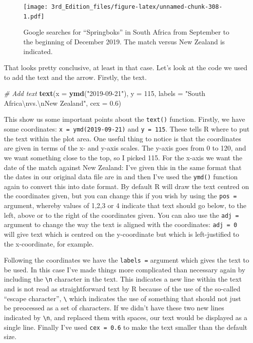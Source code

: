 \documentclass[
]{book}
\newenvironment{Shaded}{\begin{snugshade}}{\end{snugshade}}
\newcommand{\CharTok}[1]{\textcolor[rgb]{0.31,0.60,0.02}{#1}}
\newcommand{\CommentTok}[1]{\textcolor[rgb]{0.56,0.35,0.01}{\textit{#1}}}
\newcommand{\DataTypeTok}[1]{\textcolor[rgb]{0.13,0.29,0.53}{#1}}
\newcommand{\DecValTok}[1]{\textcolor[rgb]{0.00,0.00,0.81}{#1}}
\newcommand{\FloatTok}[1]{\textcolor[rgb]{0.00,0.00,0.81}{#1}}
\newcommand{\KeywordTok}[1]{\textcolor[rgb]{0.13,0.29,0.53}{\textbf{#1}}}
\newcommand{\NormalTok}[1]{#1}
\newcommand{\StringTok}[1]{\textcolor[rgb]{0.31,0.60,0.02}{#1}}
\begin{document}
\begin{figure}
\centering
\texttt{[image: 3rd\_Edition\_files/figure-latex/unnamed-chunk-308-1.pdf]}
\caption{\label{fig:unnamed-chunk-308}Google searches for ``Springboks'' in South Africa from September to the beginning of December 2019. The match versus New Zealand is indicated.}
\end{figure}

That looks pretty conclusive, at least in that case. Let's look at the code we used to add the text and the arrow. Firstly, the text.

\begin{Shaded}
\begin{Highlighting}[]
\CommentTok{# Add text}
\KeywordTok{text}\NormalTok{(}\DataTypeTok{x =} \KeywordTok{ymd}\NormalTok{(}\StringTok{"2019-09-21"}\NormalTok{), }
     \DataTypeTok{y =} \DecValTok{115}\NormalTok{,}
     \DataTypeTok{labels =} \StringTok{"South Africa}\CharTok{\textbackslash{}n}\StringTok{vs.}\CharTok{\textbackslash{}n}\StringTok{New Zealand"}\NormalTok{, }
     \DataTypeTok{cex =} \FloatTok{0.6}\NormalTok{)}
\end{Highlighting}
\end{Shaded}

This show us some important points about the \texttt{text()} function. Firstly, we have some coordinates: \texttt{x\ =\ ymd(2019-09-21)} and \texttt{y\ =\ 115}. These tells R where to put the text within the plot area. One useful thing to notice is that the coordinates are given in terms of the x- and y-axis scales. The y-axis goes from 0 to 120, and we want something close to the top, so I picked 115. For the x-axis we want the date of the match against New Zealand: I've given this in the same format that the dates in our original data file are in and then I've used the \texttt{ymd()} function again to convert this into date format. By default R will draw the text centred on the coordinates given, but you can change this if you wish by using the \texttt{pos\ =} argument, whereby values of 1,2,3 or 4 indicate that text should go below, to the left, above or to the right of the coordinates given. You can also use the \texttt{adj\ =} argument to change the way the text is aligned with the coordinates: \texttt{adj\ =\ 0} will give text which is centred on the y-coordinate but which is left-justified to the x-coordinate, for example.

Following the coordinates we have the \texttt{labels\ =} argument which gives the text to be used. In this case I've made things more complicated than necessary again by including the \texttt{\textbackslash{}n} character in the text. This indicates a new line within the text and is not read as straightforward text by R because of the use of the so-called ``escape character'', \texttt{\textbackslash{}} which indicates the use of something that should not just be preocessed as a set of characters. If we didn't have these two new lines indicated by \texttt{\textbackslash{}n}, and replaced them with spaces, our text would be displayed as a single line. Finally I've used \texttt{cex\ =\ 0.6} to make the text smaller than the default size.
\end{document}
